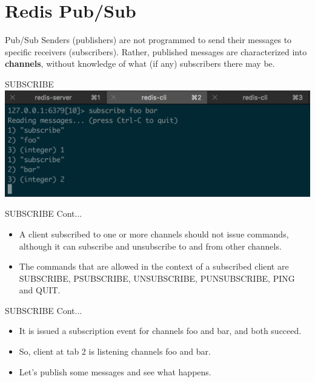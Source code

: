 \documentclass[10pt]{beamer}
\begin{document}
\section{Redis Pub/Sub}

\begin{frame}[fragile]{Pub/Sub}
  Senders (publishers) are not programmed to send their messages to specific
  receivers (subscribers). Rather, published messages are characterized into
  \textbf{channels}, without knowledge of what (if any) subscribers there may
  be.
\end{frame}

\begin{frame}[fragile]{SUBSCRIBE}
  \includegraphics[scale=0.5]{img/subscribe}
\end{frame}

\begin{frame}[fragile]{SUBSCRIBE Cont...}
  \begin{itemize}
      \item A client subscribed to one or more channels should not issue
      commands, although it can subscribe and unsubscribe to and from other
      channels.
      \item The commands that are allowed in the context of a subscribed client
      are SUBSCRIBE, PSUBSCRIBE, UNSUBSCRIBE, PUNSUBSCRIBE, PING and QUIT.
  \end{itemize}
\end{frame}

\begin{frame}[fragile]{SUBSCRIBE Cont...}
  \begin{itemize}
    \item It is issued a subscription event for channels foo and bar, and both
    succeed.
    \item So, client at tab 2 is listening channels foo and bar.
    \item Let's publish some messages and see what happens.
  \end{itemize}
\end{frame}
\end{document}
